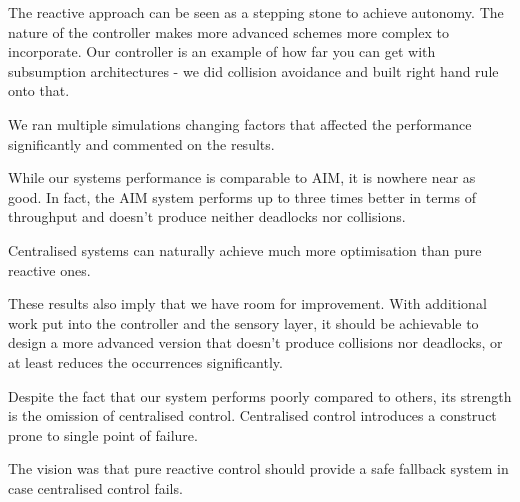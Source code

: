 The reactive approach can be seen as a stepping stone to achieve autonomy.
The nature of the controller makes more advanced schemes more complex to incorporate.
Our controller is an example of how far you can get with subsumption architectures - we did collision avoidance and built right hand rule onto that.

We ran multiple simulations changing factors that affected the performance significantly and commented on the results.

While our systems performance is comparable to AIM\cite{texas}, it is nowhere near as good.
In fact, the AIM system performs up to three times better in terms of throughput and doesn't produce neither deadlocks nor collisions.

Centralised systems can naturally achieve much more optimisation than pure reactive ones.

These results also imply that we have room for improvement.
With additional work put into the controller and the sensory layer, it should be achievable to design a more advanced version that doesn't produce collisions nor deadlocks, or at least reduces the occurrences significantly.

Despite the fact that our system performs poorly compared to others, its strength is the omission of centralised control. 
Centralised control introduces a construct prone to single point of failure.

The vision was that pure reactive control should provide a safe fallback system in case centralised control fails.
